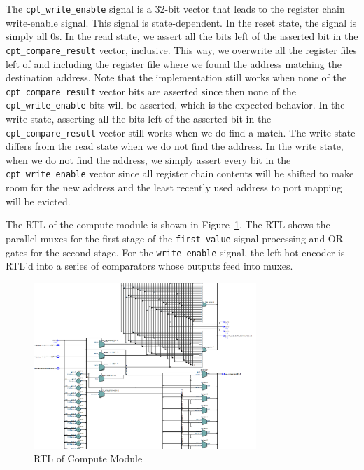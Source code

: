 \documentclass{article}
\begin{document}
The \texttt{cpt\_write\_enable} signal is a 32-bit vector that leads to the register chain write-enable signal. This signal is state-dependent. In the reset state, the signal is simply all 0s. In the read state, we assert all the bits left of the asserted bit in the \texttt{cpt\_compare\_result} vector, inclusive. This way, we overwrite all the register files left of and including the register file where we found the address matching the destination address. Note that the implementation still works when none of the \texttt{cpt\_compare\_result} vector bits are asserted since then none of the \texttt{cpt\_write\_enable} bits will be asserted, which is the expected behavior. In the write state, asserting all the bits left of the asserted bit in the \texttt{cpt\_compare\_result} vector still works when we do find a match. The write state differs from the read state when we do not find the address. In the write state, when we do not find the address, we simply assert every bit in the \texttt{cpt\_write\_enable} vector since all register chain contents will be shifted to make room for the new address and the least recently used address to port mapping will be evicted.

The RTL of the compute module is shown in Figure~\ref{fig:compute-rtl}. The RTL shows the parallel muxes for the first stage of the \texttt{first\_value} signal processing and OR gates for the second stage. For the \texttt{write\_enable} signal, the left-hot encoder is RTL'd into a series of comparators whose outputs feed into muxes. 

\begin{figure}[ht!]
  \centering
  	\includegraphics[width=0.75\textwidth]{compute_rtl.PNG}
  \caption{RTL of Compute Module}
  \label{fig:compute-rtl}
\end{figure}
\end{document}
